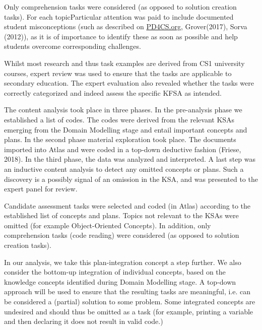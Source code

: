 Only comprehension tasks were considered (as opposed to solution creation tasks). For each topicParticular attention was paid to include documented student misconceptions (such as described on \url{PD4CS.org}, Grover(2017), Sorva (2012)), as it is of importance to identify these as soon as possible and help students overcome corresponding challenges.


Whilst most research and thus task examples are derived from CS1 university courses, expert review was used to ensure that the tasks are applicable to secondary education. The expert evaluation also revealed whether the tasks were correctly categorized and indeed assess the specific KFSA as intended.


The content analysis took place in three phases. In the pre-analysis phase we established a list of codes. The codes were derived from the relevant KSAs emerging from the Domain Modelling stage and entail important concepts and plans. In the second phase material exploration took place. The documents imported into Atlas and were coded in a top-down deductive fashion (Friese, 2018). In the third phase, the data was analyzed and interpreted. A last step was an inductive content analysis to detect any omitted concepts or plans. Such a discovery is a possibly signal of an omission in the KSA, and was presented to the expert panel for review.




Candidate assessment tasks were selected and coded (in Atlas) according to the established list of concepts and plans. Topics not relevant to the KSAs were omitted (for example Object-Oriented Concepts). In addition, only comprehension tasks (code reading) were considered (as opposed to solution creation tasks).



In our analysis, we take this plan-integration concept a step further. We also consider the bottom-up integration of individual concepts, based on the knowledge concepts identified during Domain Modelling stage. A top-down approach will be used to ensure that the resulting tasks are meaningful, i.e. can be considered a (partial) solution to some problem. Some integrated concepts are undesired and should thus be omitted as a task (for example, printing a variable and then declaring it does not result in valid code.)


